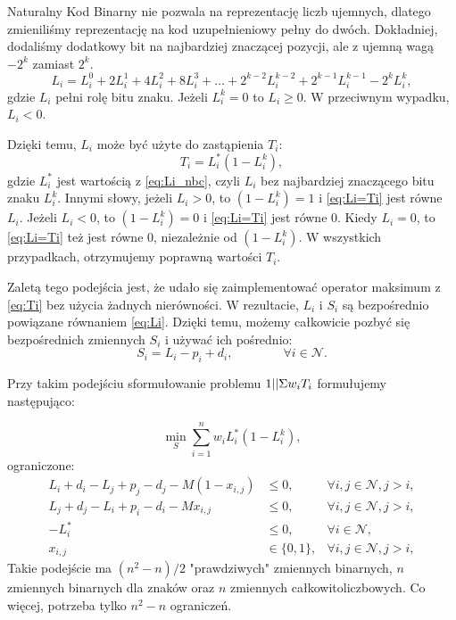 Naturalny Kod Binarny nie pozwala na reprezentację liczb ujemnych, dlatego zmieniliśmy reprezentację na kod uzupełnieniowy pełny do dwóch. Dokładniej, dodaliśmy dodatkowy bit na najbardziej znaczącej pozycji, ale z ujemną wagą $-2^k$ zamiast $2^k$.
%
\begin{equation}
    L_i = L_i^0 + 2 L_i^1 + 4 L_i^2 + 8 L_i^3 + \dots{} + 2^{k-2} L_i^{k-2} + 2^{k-1} L_i^{k-1} - 2^k L_i^k , 
\end{equation}
%
gdzie $L_i$ pełni rolę bitu znaku. Jeżeli $L_i^k=0$ to $L_i\geq{}0$. W przeciwnym wypadku, $L_i<0$.

Dzięki temu, $L_i$ może być użyte do zastąpienia $T_i$:
%
\begin{equation}\label{eq:Li=Ti}
    T_i = L_i^* (1 - L_i^k) ,
\end{equation}
%
gdzie $L_i^*$ jest wartością z \eqref{eq:Li_nbc}, czyli $L_i$ bez najbardziej znaczącego bitu znaku $L_i^k$. Innymi słowy, jeżeli $L_i>0$, to $(1 - L_i^k)=1$ i \eqref{eq:Li=Ti} jest równe $L_i$. Jeżeli $L_i<0$, to $(1 - L_i^k)=0$ i \eqref{eq:Li=Ti} jest równe 0. Kiedy $L_i=0$, to \eqref{eq:Li=Ti} też jest równe 0, niezależnie od $(1 - L_i^k)$. W wszystkich przypadkach, otrzymujemy poprawną wartości $T_i$.

Zaletą tego podejścia jest, że udało się zaimplementować operator maksimum z \eqref{eq:Ti} bez użycia żadnych nierówności. W rezultacie, $L_i$ i $S_i$ są bezpośrednio powiązane równaniem \eqref{eq:Li}. Dzięki temu, możemy całkowicie pozbyć się bezpośrednich zmiennych $S_i$ i używać ich pośrednio:
%
\begin{equation}
    S_i = L_i - p_i + d_i, \quad{}\quad{}\quad{}\quad{} \forall{}i\in\mathcal{N} . 
\end{equation}

Przy takim podejściu sformułowanie problemu $1||\Sigma{}w_i T_i$ formułujemy następująco:

\begin{equation}\label{eq:wiTi_dwave_B_1}
    \min_S \sum_{i=1}^n w_i L_i^* (1 - L_i^k) ,
\end{equation}
%
ograniczone:
%
\begin{align}
    L_i + d_i - L_j + p_j - d_j - M(1-x_{i,j}) & \leq{} 0, & \forall{}i,j\in{}\mathcal{N},j>i, \label{eq:wiTi_dwave_B_2} \\
    L_j + d_j - L_i + p_i - d_i - Mx_{i,j} & \leq{} 0, & \forall{}i,j\in{}\mathcal{N},j>i, \label{eq:wiTi_dwave_B_3} \\
    -L_i^* & \leq{} 0, & \forall{}i\in{}\mathcal{N}, \label{eq:wiTi_dwave_B_4} \\
    x_{i,j} & \in \{0,1\}, & \forall{}i,j\in{}\mathcal{N},j>i, \label{eq:wiTi_dwave_B_5}
\end{align}
%
Takie podejście ma $(n^2-n)/2$ "prawdziwych" zmiennych binarnych, $n$ zmiennych binarnych dla znaków oraz $n$ zmiennych całkowitoliczbowych. Co więcej, potrzeba tylko $n^2-n$ ograniczeń.


